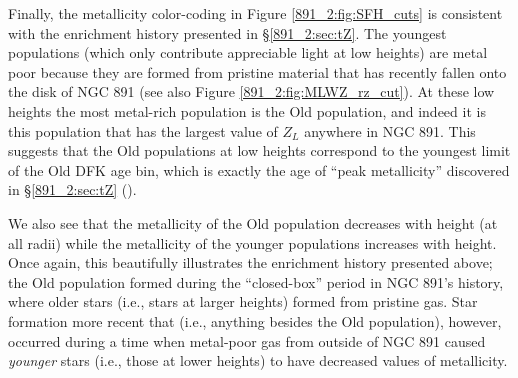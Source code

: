 

Finally, the metallicity color-coding in Figure
\ref{891_2:fig:SFH_cuts} is consistent with the enrichment history
presented in \S\ref{891_2:sec:tZ}. The youngest populations (which
only contribute appreciable light at low heights) are metal poor
because they are formed from pristine material that has recently
fallen onto the disk of NGC 891 (see also Figure
\ref{891_2:fig:MLWZ_rz_cut}). At these low heights the most metal-rich
population is the Old population, and indeed it is this population
that has the largest value of $Z_L$ anywhere in NGC 891. This suggests
that the Old populations at low heights correspond to the youngest
limit of the Old DFK age bin, which is exactly the age of ``peak
metallicity'' discovered in \S\ref{891_2:sec:tZ} ().

We also see that the metallicity of the Old population decreases with
height (at all radii) while the metallicity of the younger populations
increases with height. Once again, this beautifully illustrates the
enrichment history presented above; the Old population formed during
the ``closed-box'' period in NGC 891's history, where older stars
(i.e., stars at larger heights) formed from pristine gas. Star
formation more recent that  (i.e., anything besides the
Old population), however, occurred during a time when metal-poor gas
from outside of NGC 891 caused \emph{younger} stars (i.e., those at
lower heights) to have decreased values of metallicity.


